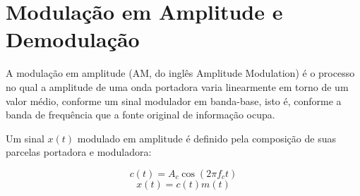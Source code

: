 \section{Modulação em Amplitude e Demodulação}
A modulação em amplitude (AM, do inglês Amplitude Modulation) é o processo no
qual a amplitude de uma onda portadora varia linearmente em torno de um valor
médio, conforme um sinal modulador em banda-base, isto é, conforme a banda de
frequência que a fonte original de informação ocupa.

Um sinal $x(t)$ modulado em amplitude é definido pela composição de suas parcelas portadora e moduladora:

\begin{equation}
    c(t) = A_c \cos(2\pi f_c t)
\end{equation}
\begin{equation}
    x(t) = c(t)m(t)
\end{equation}
